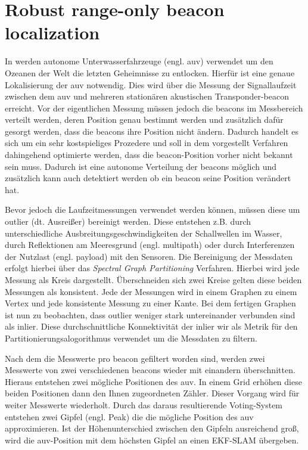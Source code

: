 \section{Robust range-only beacon localization}

In \cite{olson2004robust} werden autonome Unterwasserfahrzeuge (engl. \gls{auv}) verwendet um den Ozeanen der Welt die letzten Geheimnisse zu entlocken. Hierfür ist eine genaue Lokalisierung der \gls{auv} notwendig. Dies wird über die Messung der Signallaufzeit zwischen dem \gls{auv} und mehreren stationären akustischen Transponder-\Gls{beacon} erreicht. Vor der eigentlichen Messung müssen jedoch die \Glspl{beacon} im Messbereich verteilt werden, deren Position genau bestimmt werden und zusätzlich dafür gesorgt werden, dass die \Glspl{beacon} ihre Position nicht ändern. Dadurch handelt es sich um ein sehr kostspieliges Prozedere und soll in dem vorgestellt Verfahren dahingehend optimierte werden, dass die \Gls{beacon}-Position vorher nicht bekannt sein muss. Dadurch ist eine autonome Verteilung der \Glspl{beacon} möglich und zusätzlich kann auch detektiert werden ob ein \Gls{beacon} seine Position verändert hat.

Bevor jedoch die Laufzeitmessungen verwendet werden können, müssen diese um \Gls{outlier} (dt. Ausreißer) bereinigt werden. Diese entstehen z.B. durch unterschiedliche Ausbreitungsgeschwindigkeiten der Schallwellen im Wasser, durch Reflektionen am Meeresgrund (engl. \Gls{multipath}) oder durch Interferenzen der Nutzlast (engl. \Gls{payload}) mit den Sensoren. Die Bereinigung der Messdaten erfolgt hierbei über das \textit{Spectral Graph Partitioning} Verfahren. Hierbei wird jede Messung als Kreis dargestellt. Überschneiden sich zwei Kreise gelten diese beiden Messungen als konsistent. Jede der Messungen wird in einem Graphen zu einem Vertex und jede konsistente Messung zu einer Kante. Bei dem fertigen Graphen ist nun zu beobachten, dass \Gls{outlier} weniger stark untereinander verbunden sind als \Gls{inlier}. Diese durchschnittliche Konnektivität der \Gls{inlier} wir als Metrik für den Partitionierungsalogorithmus verwendet um die Messdaten zu filtern.

Nach dem die Messwerte pro \Gls{beacon} gefiltert worden sind, werden zwei Messwerte von zwei verschiedenen \Glspl{beacon} wieder mit einandern überschnitten. Hieraus entstehen zwei mögliche Positionen des \gls{auv}. In einem Grid erhöhen diese beiden Positionen dann den Ihnen zugeordneten Zähler. Dieser Vorgang wird für weiter Messwerte wiederholt. Durch das daraus resultierende Voting-System entstehen zwei Gipfel (engl. Peak) die die mögliche Position des \gls{auv} approximieren. Ist der Höhenunterschied zwischen den Gipfeln ausreichend groß, wird die \gls{auv}-Position mit dem höchsten Gipfel an einen EKF-SLAM übergeben.


